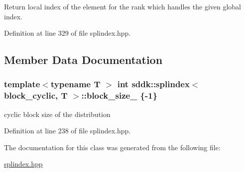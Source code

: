 Return local index of the element for the rank which handles the given global index. 



Definition at line 329 of file splindex.\+hpp.



\subsection{Member Data Documentation}
\hypertarget{classsddk_1_1splindex_3_01block__cyclic_00_01_t_01_4_ac32a632137604b0e84304c053618fe36}{}
\subsubsection[{block\+\_\+size\+\_\+}]{\setlength{\rightskip}{0pt plus 5cm}template$<$typename T $>$ int {\bf sddk\+::splindex}$<$ block\+\_\+cyclic, T $>$\+::block\+\_\+size\+\_\+ \{-\/1\}\hspace{0.3cm}{\ttfamily [private]}}\label{classsddk_1_1splindex_3_01block__cyclic_00_01_t_01_4_ac32a632137604b0e84304c053618fe36}


cyclic block size of the distribution 



Definition at line 238 of file splindex.\+hpp.



The documentation for this class was generated from the following file\+:\begin{DoxyCompactItemize}
\item 
\hyperlink{splindex_8hpp}{splindex.\+hpp}\end{DoxyCompactItemize}
